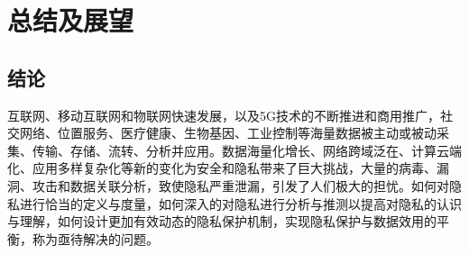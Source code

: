 \chapter{总结及展望}
\label{chap:conclusions}


\section{结论}
互联网、移动互联网和物联网快速发展，以及5G技术的不断推进和商用推广，社交网络、位置服务、医疗健康、生物基因、工业控制等海量数据被主动或被动采集、传输、存储、流转、分析并应用。数据海量化增长、网络跨域泛在、计算云端化、应用多样复杂化等新的变化为安全和隐私带来了巨大挑战，大量的病毒、漏洞、攻击和数据关联分析，致使隐私严重泄漏，引发了人们极大的担忧。如何对隐私进行恰当的定义与度量，如何深入的对隐私进行分析与推测以提高对隐私的认识与理解，如何设计更加有效动态的隐私保护机制，实现隐私保护与数据效用的平衡，称为亟待解决的问题。

